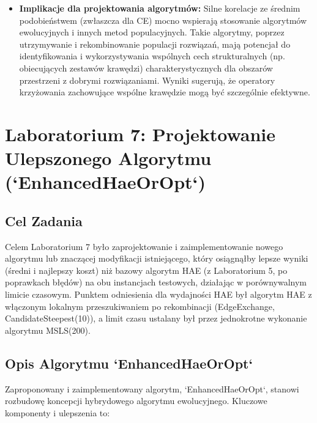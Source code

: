 \documentclass[12pt,a4paper]{article}
\begin{document}
\begin{itemize}
    \item \textbf{Implikacje dla projektowania algorytmów:} Silne korelacje ze średnim podobieństwem (zwłaszcza dla CE) mocno wspierają stosowanie algorytmów ewolucyjnych i innych metod populacyjnych. Takie algorytmy, poprzez utrzymywanie i rekombinowanie populacji rozwiązań, mają potencjał do identyfikowania i wykorzystywania wspólnych cech strukturalnych (np. obiecujących zestawów krawędzi) charakterystycznych dla obszarów przestrzeni z dobrymi rozwiązaniami. Wyniki sugerują, że operatory krzyżowania zachowujące wspólne krawędzie mogą być szczególnie efektywne.
\end{itemize}

\section{Laboratorium 7: Projektowanie Ulepszonego Algorytmu (`EnhancedHaeOrOpt`)}
\label{sec:lab7}

\subsection{Cel Zadania}
Celem Laboratorium 7 było zaprojektowanie i zaimplementowanie nowego algorytmu lub znaczącej modyfikacji istniejącego, który osiągnąłby lepsze wyniki (średni i najlepszy koszt) niż bazowy algorytm HAE (z Laboratorium 5, po poprawkach błędów) na obu instancjach testowych, działając w porównywalnym limicie czasowym. Punktem odniesienia dla wydajności HAE był algorytm HAE z włączonym lokalnym przeszukiwaniem po rekombinacji (EdgeExchange, CandidateSteepest(10)), a limit czasu ustalany był przez jednokrotne wykonanie algorytmu MSLS(200).

\subsection{Opis Algorytmu `EnhancedHaeOrOpt`}
Zaproponowany i zaimplementowany algorytm, `EnhancedHaeOrOpt`, stanowi rozbudowę koncepcji hybrydowego algorytmu ewolucyjnego. Kluczowe komponenty i ulepszenia to:
\end{document}
